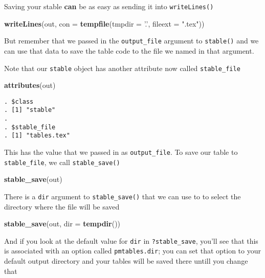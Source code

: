 \documentclass[
]{book}
\newenvironment{Shaded}{\begin{snugshade}}{\end{snugshade}}
\newcommand{\DataTypeTok}[1]{\textcolor[rgb]{0.13,0.29,0.53}{#1}}
\newcommand{\KeywordTok}[1]{\textcolor[rgb]{0.13,0.29,0.53}{\textbf{#1}}}
\newcommand{\NormalTok}[1]{#1}
\newcommand{\StringTok}[1]{\textcolor[rgb]{0.31,0.60,0.02}{#1}}
\begin{document}
Saving your stable \textbf{can} be as easy as sending it into \texttt{writeLines()}

\begin{Shaded}
\begin{Highlighting}[]
\KeywordTok{writeLines}\NormalTok{(out, }\DataTypeTok{con =} \KeywordTok{tempfile}\NormalTok{(}\DataTypeTok{tmpdir =} \StringTok{'.'}\NormalTok{, }\DataTypeTok{fileext =} \StringTok{".tex"}\NormalTok{))}
\end{Highlighting}
\end{Shaded}

But remember that we passed in the \texttt{output\_file} argument to \texttt{stable()}
and we can use that data to save the table code to the file we named
in that argument.

Note that our \texttt{stable} object has another attribute now called \texttt{stable\_file}

\begin{Shaded}
\begin{Highlighting}[]
\KeywordTok{attributes}\NormalTok{(out)}
\end{Highlighting}
\end{Shaded}

\begin{verbatim}
. $class
. [1] "stable"
. 
. $stable_file
. [1] "tables.tex"
\end{verbatim}

This has the value that we passed in as \texttt{output\_file}. To save our table
to \texttt{stable\_file}, we call \texttt{stable\_save()}

\begin{Shaded}
\begin{Highlighting}[]
\KeywordTok{stable_save}\NormalTok{(out)}
\end{Highlighting}
\end{Shaded}

There is a \texttt{dir} argument to \texttt{stable\_save()} that we can use to to select
the directory where the file will be saved

\begin{Shaded}
\begin{Highlighting}[]
\KeywordTok{stable_save}\NormalTok{(out, }\DataTypeTok{dir =} \KeywordTok{tempdir}\NormalTok{())}
\end{Highlighting}
\end{Shaded}

And if you look at the default value for \texttt{dir} in \texttt{?stable\_save}, you'll
see that this is associated with an option called \texttt{pmtables.dir}; you
can set that option to your default output directory and your tables
will be saved there untill you change that
\end{document}
